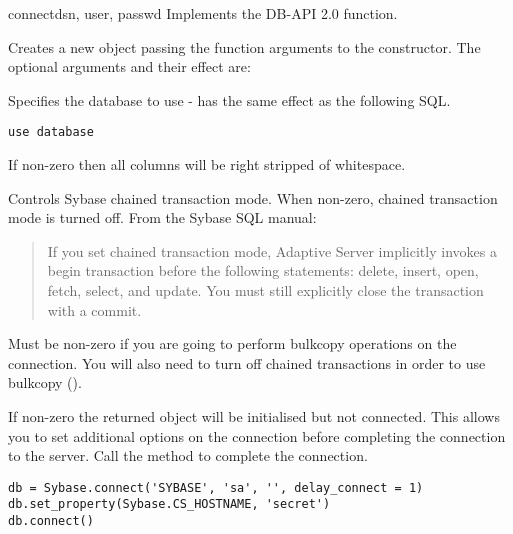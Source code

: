 \begin{funcdesc}{connect}{dsn, user, passwd \optional{, \ldots}}
Implements the DB-API 2.0  function.

Creates a new  object passing the function arguments
to the  constructor.  The
optional arguments and their effect are:

\begin{description}
\item{}

Specifies the database to use - has the same effect as the following
SQL.

\begin{verbatim}
use database
\end{verbatim}

\item{}

If non-zero then all  columns will be right stripped of
whitespace.

\item{}

Controls Sybase chained transaction mode.  When non-zero, chained
transaction mode is turned off.  From the Sybase SQL manual:

\begin{quote}
If you set chained transaction mode, Adaptive Server implicitly
invokes a begin transaction before the following statements: delete,
insert, open, fetch, select, and update. You must still explicitly
close the transaction with a commit.
\end{quote}

\item{}

Must be non-zero if you are going to perform bulkcopy operations on
the connection.  You will also need to turn off chained transactions
in order to use bulkcopy ().

\item{}

If non-zero the returned  object will be initialised
but not connected.  This allows you to set additional options on the
connection before completing the connection to the server.  Call the
 method to complete the connection.

\begin{verbatim}
db = Sybase.connect('SYBASE', 'sa', '', delay_connect = 1)
db.set_property(Sybase.CS_HOSTNAME, 'secret')
db.connect()
\end{verbatim}


\end{description}
\end{funcdesc}

